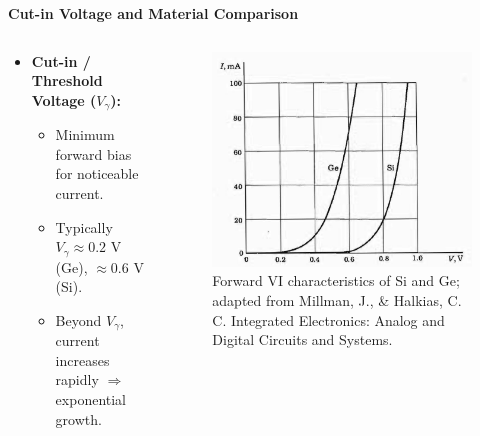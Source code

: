 \begin{frame}{\textbf{Cut-in Voltage and Material Comparison}}
	\begin{columns}
		\begin{column}{0.35\textwidth}
    \begin{itemize}
        \item \textbf{Cut-in / Threshold Voltage ($V_\gamma$):}
        \begin{itemize}
            \item Minimum forward bias for noticeable current.
            \item Typically $V_\gamma \approx 0.2$ V (Ge), $\approx 0.6$ V (Si).
            \item Beyond $V_\gamma$, current increases rapidly $\Rightarrow$ exponential growth.
        \end{itemize}
	\end{itemize}
\end{column}
\begin{column}{0.65\textwidth}
	\begin{figure}
		\centering
		\includegraphics[scale=0.25]{fig/lec03/VI_character_Si_Ge.png}
		\caption{Forward VI characteristics of Si and Ge; adapted from Millman, J., \& Halkias, C. C. Integrated Electronics: Analog and Digital Circuits and Systems.}
		\label{fig:Si_Ge_diode_characteristics}
	\end{figure}
	\end{column}
	\end{columns}
\end{frame}


